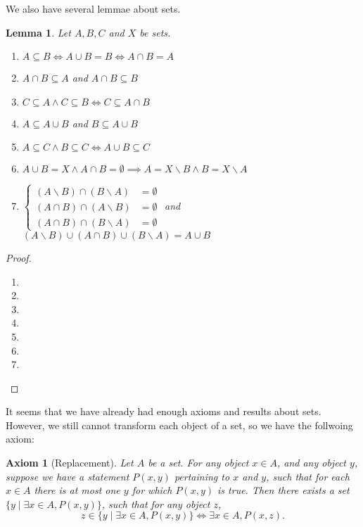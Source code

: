 \documentclass[a4paper]{book}
\newtheorem*{proof}{\textit{Proof.}}
\newtheorem{axiom}{Axiom}[chapter]
\newtheorem{lemma}{Lemma}[section]
\begin{document}
			We also have several lemmae about sets.
			\begin{lemma}
				Let $A,B,C$ and $X$ be sets.
				\begin{enumerate}[label=($\alph*$)]
					\item $A\subseteq B\iff A\cup B=B\iff A\cap B=A$
					\item $A\cap B\subseteq A$ and $A\cap B\subseteq B$
					\item $C\subseteq A\land C\subseteq B\iff C\subseteq A\cap B$
					\item $A\subseteq A\cup B$ and $B\subseteq A\cup B$
					\item $A\subseteq C\land B\subseteq C\iff A\cup B\subseteq C$
					\item $A\cup B=X\land A\cap B=\emptyset\implies A=X\backslash B\land B=X\backslash A$
					\item 	$\left\{
									\begin{aligned}
										(A\backslash B)\cap (B\backslash A)&=\emptyset\\
										(A\cap B)\cap (A\backslash B)&=\emptyset\\
										(A\cap B)\cap (B\backslash A)&=\emptyset
									\end{aligned}
									\right.$ and $(A\backslash B)\cup(A\cap B)\cup(B\backslash A)=A\cup B$
				\end{enumerate}
			\end{lemma}
			\begin{proof}~
				\begin{enumerate}[label=($\alph*$)]
					\item
					\item
					\item
					\item
					\item
					\item
					\item
				\end{enumerate}
			\end{proof}
			It seems that we have already had enough axioms and results about sets. However, we still cannot transform each object of a set, so we have the follwoing axiom:
			\begin{axiom}[Replacement]
				Let $A$ be a set. For any object $x\in A$, and any object $y$, suppose we have a statement $P(x,y)$ pertaining to $x$ and $y$, such that for each $x\in A$ there is at most one $y$ for which $P(x,y)$ is true. Then there exists a set $\{y\mid\exists x\in A,P(x,y)\}$, such that for any object $z$, $$z\in\{y\mid\exists x\in A,P(x,y)\}\iff \exists x\in A, P(x,z).$$
			\end{axiom}
\end{document}
